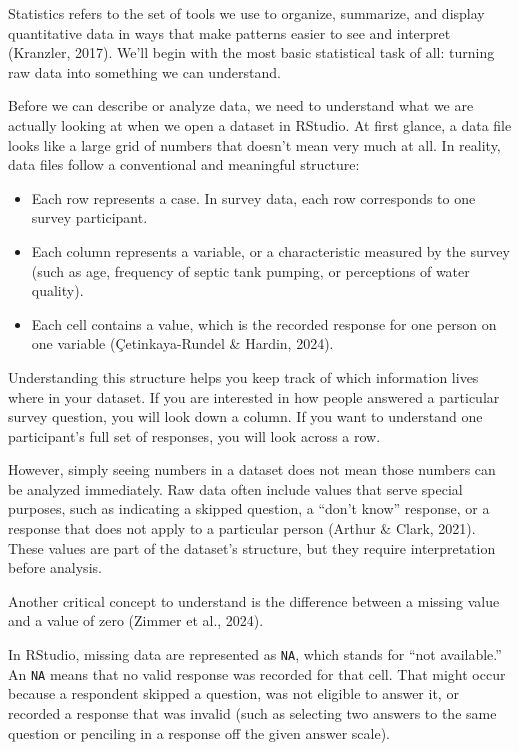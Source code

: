 \documentclass[
  letterpaper,
  DIV=11,
  numbers=noendperiod]{scrreprt}
\providecommand{\tightlist}{%
  \setlength{\itemsep}{0pt}\setlength{\parskip}{0pt}}
\begin{document}
Statistics refers to the set of tools we use to organize, summarize, and
display quantitative data in ways that make patterns easier to see and
interpret (Kranzler, 2017). We'll begin with the most basic statistical
task of all: turning raw data into something we can understand.

Before we can describe or analyze data, we need to understand what we
are actually looking at when we open a dataset in RStudio. At first
glance, a data file looks like a large grid of numbers that doesn't mean
very much at all. In reality, data files follow a conventional and
meaningful structure:

\begin{itemize}
\tightlist
\item
  Each row represents a case. In survey data, each row corresponds to
  one survey participant.
\item
  Each column represents a variable, or a characteristic measured by the
  survey (such as age, frequency of septic tank pumping, or perceptions
  of water quality).
\item
  Each cell contains a value, which is the recorded response for one
  person on one variable (Çetinkaya-Rundel \& Hardin, 2024).
\end{itemize}

Understanding this structure helps you keep track of which information
lives where in your dataset. If you are interested in how people
answered a particular survey question, you will look down a column. If
you want to understand one participant's full set of responses, you will
look across a row.

However, simply seeing numbers in a dataset does not mean those numbers
can be analyzed immediately. Raw data often include values that serve
special purposes, such as indicating a skipped question, a ``don't
know'' response, or a response that does not apply to a particular
person (Arthur \& Clark, 2021). These values are part of the dataset's
structure, but they require interpretation before analysis.

Another critical concept to understand is the difference between a
missing value and a value of zero (Zimmer et al., 2024).

In RStudio, missing data are represented as \texttt{NA}, which stands
for ``not available.'' An \texttt{NA} means that no valid response was
recorded for that cell. That might occur because a respondent skipped a
question, was not eligible to answer it, or recorded a response that was
invalid (such as selecting two answers to the same question or penciling
in a response off the given answer scale).
\end{document}
